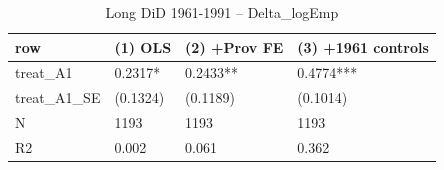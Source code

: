 \begin{table}

\caption{Long DiD 1961-1991 -- Delta_logEmp}
\centering
\begin{tabular}[t]{llll}
\toprule
row & (1) OLS & (2) +Prov FE & (3) +1961 controls\\
\midrule
treat\_A1 & 0.2317* & 0.2433** & 0.4774***\\
treat\_A1\_SE & (0.1324) & (0.1189) & (0.1014)\\
N & 1193 & 1193 & 1193\\
R2 & 0.002 & 0.061 & 0.362\\
\bottomrule
\end{tabular}
\end{table}

